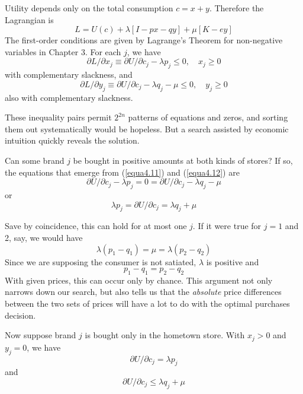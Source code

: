 Utility depends only on the total consumption $c=x+y$. Therefore the Lagrangian is
\begin{equation*}
  L = U(c )+ \lambda[I- px-qy] + \mu [K-ey]
\end{equation*}
The first-order conditions are given by Lagrange's Theorem for non-negative variables in Chapter 3. For each $j$, we have
\begin{equation} \label{equa4.11}
 \partial L / \partial x_j  \equiv   \partial U / \partial c_j - \lambda p_j \leq 0, \quad x_j \geq 0
\end{equation}
with complementary slackness, and
\begin{equation} \label{equa4.12}
 \partial L / \partial y_j  \equiv   \partial U / \partial c_j - \lambda q_j -\mu \leq 0, \quad y_j \geq 0
\end{equation}
also with complementary slackness.

These inequality pairs permit $2^{2n}$ patterns of equations and zeros, and sorting them out systematically would be hopeless. But a search assisted by economic intuition quickly reveals the solution.

Can some brand $j$ be bought in positive amounts at both kinds of stores? If so, the equations that emerge from (\ref{equa4.11}) and (\ref{equa4.12}) are
\begin{equation*}
 \partial U / \partial c_j - \lambda p_j = 0 = \partial U / \partial c_j  -\lambda q_j - \mu
\end{equation*}
or
\begin{equation} \label{equa4.13}
\lambda p_j = \partial U /\partial c_j = \lambda q_j + \mu
\end{equation}

Save by coincidence, this can hold for at most one $j$. If it were true for $j=1$ and 2, say, we would have
\begin{equation*}
 \lambda(p_1 - q_1) = \mu = \lambda (p_2 - q_2)
\end{equation*}
Since we are supposing the consumer is not satiated, $\lambda$ is positive and
\begin{equation*}
   p_1 - q_1 = p_2 - q_2
\end{equation*}
With given prices, this can occur only by chance. This argument not only narrows down our search, but also tells us that the \textit{absolute} price differences between the two sets of prices will have a lot to do with the optimal purchases decision.

Now suppose brand $j$ is bought only in the hometown store. With $x_j >0$ and $y_j=0$, we have
\begin{equation} \label{equa4.14}
 \partial U / \partial c_j  = \lambda p_j
\end{equation}
and
\begin{equation} \label{equa4.15}
 \partial U / \partial c_j \leq  \lambda q_j + \mu
\end{equation}

